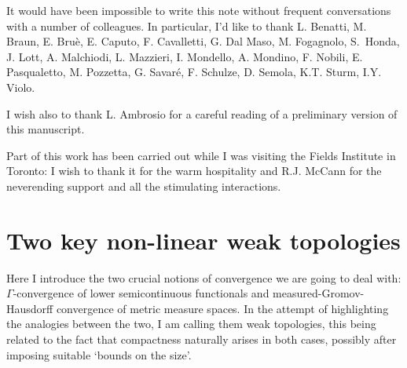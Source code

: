 \documentclass[11pt]{article}
\numberwithin{equation}{section}
\begin{document}
It would have been impossible to write this note without frequent conversations with a number of colleagues. In particular, I'd like to thank L. Benatti, M. Braun, E. Bru\`e, E. Caputo, F. Cavalletti, G. Dal Maso, M. Fogagnolo, S.\ Honda, J. Lott, A. Malchiodi, L. Mazzieri, I. Mondello, A. Mondino, F. Nobili, E. Pasqualetto, M. Pozzetta, G. Savar\'e, F. Schulze, D. Semola,  K.T. Sturm,  I.Y. Violo.

I wish also to thank L. Ambrosio  for a careful reading of a preliminary version of this manuscript.

Part of this work has been carried out while I was visiting the Fields Institute in Toronto: I wish to thank it for the warm hospitality and R.J. McCann for the neverending support and all the stimulating interactions.



























\section{Two key non-linear weak topologies}\label{se:weak}
Here I introduce the two crucial notions of convergence we are going to deal with: $\Gamma$-convergence of lower semicontinuous functionals and measured-Gromov-Hausdorff convergence of metric measure spaces. In the attempt of highlighting the analogies between the two, I am calling  them weak topologies, this being related to the fact that compactness naturally arises in both cases, possibly after imposing suitable  `bounds on the size'. 
\end{document}
